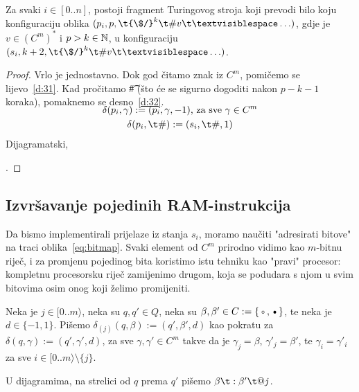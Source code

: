 \begin{lema}\label{lm:pi>si}
Za svaki $i\in[0..n]$, postoji fragment Turingovog stroja koji prevodi bilo koju konfiguraciju oblika $(p_i,p,\t{\$/}^k\t\#v\bl\ldots)$, gdje je $v\in(C^m)^*$ i $p>k\in{\mathbb N}$, u konfiguraciju $(s_i,k+2,\t{\$/}^k\t\#v\bl\ldots)$.
\end{lema}
\begin{proof}
Vrlo je jednostavno. Dok god čitamo znak iz $C^m$, pomičemo se lijevo~\eqref{d:31}. Kad pročitamo \t\# (što će se sigurno dogoditi nakon $p-k-1$ koraka), pomaknemo se desno~\eqref{d:32}.
\begin{gather}
\SwapAboveDisplaySkip
\label{d:31}
    \delta(p_i,\gamma):=(p_i,\gamma,-1)\text{, za sve }\gamma\in C^m\\
\label{d:32}
    \delta(p_i,\t\#):=(s_i,\t\#,1)
\end{gather}
Dijagramatski,
\;.
\end{proof}

\subsection{Izvršavanje pojedinih RAM-instrukcija}

Da bismo implementirali prijelaze iz stanja $s_i$, moramo naučiti "adresirati bitove" na traci oblika~\eqref{eq:bitmap}. Svaki element od $C^m$ prirodno vidimo kao $m$-bitnu riječ, i za promjenu pojedinog bita koristimo istu tehniku kao "pravi" procesor: kompletnu procesorsku riječ zamijenimo drugom, koja se podudara s njom u svim bitovima osim onog koji želimo promijeniti.

\begin{definicija}\label{def:trag}
Neka je $j\in[0..m\rangle$, neka su $q,q'\in Q$, neka su $\beta,\beta'\in C:=\{\text\textopenbullet,\text\textbullet\}$, te neka je $d\in\{-1,1\}$. Pišemo $\delta_{(j)}(q,\beta):=(q',\beta',d)$ kao pokratu za
$\delta(q,\gamma):=(q',\gamma',d)$\text,
za sve $\gamma,\gamma'\in C^m$ takve da je $\gamma_j=\beta$, $\gamma'_j=\beta'$, te $\gamma_i=\gamma'_i$ za sve $i\in[0..m\rangle\setminus\{j\}$.

U dijagramima, na strelici od $q$ prema $q'$ pišemo $\beta\t:\beta'\t@j$.
\end{definicija}

